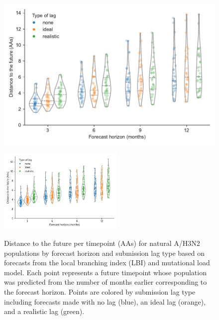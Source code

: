 \documentclass[9pt,lineno]{elife}
\begin{document}
\begin{figure}[htb]
\includegraphics[width=\linewidth]{figures/h3n2_distances_to_the_future_by_delay_and_horizon}
\caption{Distance to the future per timepoint (AAs) for natural A/H3N2 populations by forecast horizon and submission lag type based on forecasts from the local branching index (LBI) and mutational load model.
  Each point represents a future timepoint whose population was predicted from the number of months earlier corresponding to the forecast horizon.
  Points are colored by submission lag type including forecasts made with no lag (blue), an ideal lag (orange), and a realistic lag (green).}
\label{fig:h3n2_distances_to_the_future}
%
{\includegraphics[width=6cm]{figures/simulated_distances_to_the_future_by_delay_and_horizon}}\label{figsupp:simulated_distances_to_the_future}
%

\end{figure}
\end{document}
